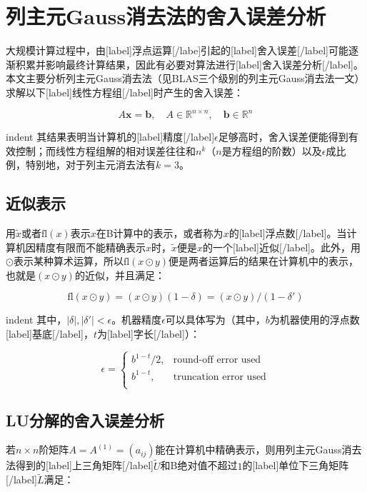 \documentclass[UTF8,nofonts]{ctexart}
\begin{document}
\section*{列主元Gauss消去法的舍入误差分析}

大规模计算过程中，由[label]浮点运算[/labe]引起的[label]舍入误差[/label]可能逐渐积累并影响最终计算结果，因此有必要对算法进行[label]舍入误差分析[/label]。本文主要分析列主元Gauss消去法（见BLAS三个级别的列主元Gauss消去法一文）求解以下[label]线性方程组[/label]时产生的舍入误差：

\[A\boldsymbol{x}=\boldsymbol{b},\quad A\in\mathbb{R}^{n \times n},\quad \boldsymbol{b}\in\mathbb{R}^n\]

indent 其结果表明当计算机的[label]精度[/label]$\epsilon$足够高时，舍入误差便能得到有效控制；而线性方程组解的相对误差往往和$n^k$（$n$是方程组的阶数）以及$\epsilon$成比例，特别地，对于列主元消去法有$k=3$。

\subsection*{近似表示}

用$\tilde{x}$或者$\text{fl}(x)$表示$x$在B计算中的表示，或者称为$x$的[label]浮点数[/label]。当计算机因精度有限而不能精确表示$x$时，$\tilde{x}$便是$x$的一个[label]近似[/label]。此外，用$\odot$表示某种算术运算，所以$\text{fl}(x \odot y)$便是两者运算后的结果在计算机中的表示，也就是$(x \odot y)$的近似，并且满足：

\[
\text{fl}(x \odot y)=(x \odot y)(1-\delta)=(x \odot y)/(1-\delta')
\]

indent 其中，$|\delta|,|\delta'|<\epsilon$。机器精度$\epsilon$可以具体写为（其中，$b$为机器使用的浮点数[label]基底[/label]，$t$为[label]字长[/label]）：

\[
\epsilon=
\begin{cases}
b^{1-t}/2,& \text{round-off error used}\\
b^{1-t},& \text{truncation error used} \\
\end{cases}
\]

\subsection*{LU分解的舍入误差分析}

若$n \times n$阶矩阵$A=A^{(1)}=(a_{ij})$能在计算机中精确表示，则用列主元Gauss消去法得到的[label]上三角矩阵[/label]$\tilde{U}$和B绝对值不超过$1$的[label]单位下三角矩阵[/label]$\tilde{L}$满足：
\end{document}
